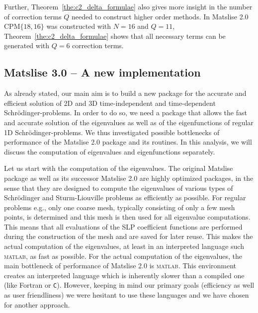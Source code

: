Further, Theorem~\ref{the:c2_delta_formulae} also gives more insight in the number of correction terms $Q$ needed to construct higher order methods. In Matslise 2.0 $\text{CPM}\{18, 16\}$ was constructed with $N=16$ and $Q=11$, Theorem~\ref{the:c2_delta_formulae} shows that all necessary terms can be generated with $Q=6$ correction terms.



\subsection{Matslise 3.0 -- A new implementation}\label{a-new-implementation}

As already stated, our main aim is to build a new package for the accurate and efficient solution of 2D and 3D time-independent and time-dependent Schrödinger-problems.
In order to do so, we need a package that allows the fast and accurate solution of the eigenvalues as well as of the eigenfunctions of regular 1D Schrödinger-problems.
We thus investigated possible bottlenecks of performance of the Matslise 2.0 package and its routines. In this analysis, we will discuss the computation of eigenvalues and eigenfunctions separately.


Let us start with the computation of the eigenvalues.
The original Matslise package as well as its successor Matslise 2.0 are highly optimized packages, in the sense that they are designed to compute the eigenvalues of various types of Schrödinger and
Sturm-Liouville problems as efficiently as possible. For regular problems e.g., only one coarse mesh, typically consisting of only a few mesh points, is determined and this mesh is then used for all eigenvalue computations. This means that all evaluations of the SLP coefficient functions are performed during the construction of the mesh and are saved for later reuse. This makes the actual computation of the eigenvalues, at least in an interpreted language such \textsc{matlab}, as fast as possible. For the actual computation of the eigenvalues, the main bottleneck of performance of Matslise 2.0 is \textsc{matlab}. This environment creates an interpreted language which is inherently slower than a compiled one (like Fortran or
\texttt{C}). However, keeping in mind our primary goals (efficiency as well as user friendliness) we were hesitant to use these languages and we have chosen for another approach.

